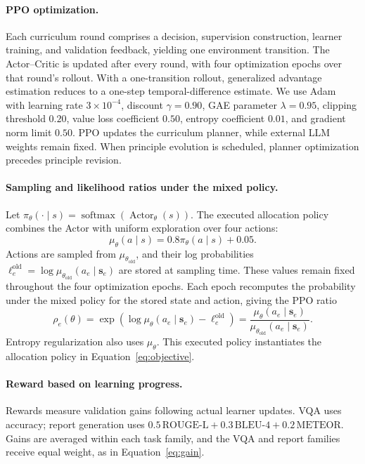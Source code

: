 \paragraph{PPO optimization.}
Each curriculum round comprises a decision, supervision construction, learner training, and validation feedback, yielding one environment transition. The Actor--Critic is updated after every round, with four optimization epochs over that round's rollout. With a one-transition rollout, generalized advantage estimation reduces to a one-step temporal-difference estimate. We use Adam~\citep{kingma2015adam} with learning rate $3\times10^{-4}$, discount $\gamma=0.90$, GAE parameter $\lambda=0.95$, clipping threshold $0.20$, value loss coefficient $0.50$, entropy coefficient $0.01$, and gradient norm limit $0.50$. PPO updates the curriculum planner, while external LLM weights remain fixed. When principle evolution is scheduled, planner optimization precedes principle revision.

\paragraph{Sampling and likelihood ratios under the mixed policy.}
Let $\pi_\theta(\cdot\mid s)=\operatorname{softmax}(\operatorname{Actor}_\theta(s))$. The executed allocation policy combines the Actor with uniform exploration over four actions:
\[
\mu_\theta(a\mid s)=0.8\pi_\theta(a\mid s)+0.05.
\]
Actions are sampled from $\mu_{\theta_{\mathrm{old}}}$, and their log probabilities $\ell_e^{\mathrm{old}}=\log\mu_{\theta_{\mathrm{old}}}(a_e\mid \mathbf{s}_e)$ are stored at sampling time. These values remain fixed throughout the four optimization epochs. Each epoch recomputes the probability under the mixed policy for the stored state and action, giving the PPO ratio
\[
\rho_e(\theta)=\exp\!\left(\log\mu_\theta(a_e\mid \mathbf{s}_e)-\ell_e^{\mathrm{old}}\right)
=\frac{\mu_\theta(a_e\mid \mathbf{s}_e)}{\mu_{\theta_{\mathrm{old}}}(a_e\mid \mathbf{s}_e)}.
\]
Entropy regularization also uses $\mu_\theta$. This executed policy instantiates the allocation policy in Equation~\ref{eq:objective}.

\paragraph{Reward based on learning progress.}
Rewards measure validation gains following actual learner updates. VQA uses accuracy; report generation uses $0.5\,\mathrm{ROUGE\mbox{-}L}+0.3\,\mathrm{BLEU\mbox{-}4}+0.2\,\mathrm{METEOR}$. Gains are averaged within each task family, and the VQA and report families receive equal weight, as in Equation~\ref{eq:gain}.

